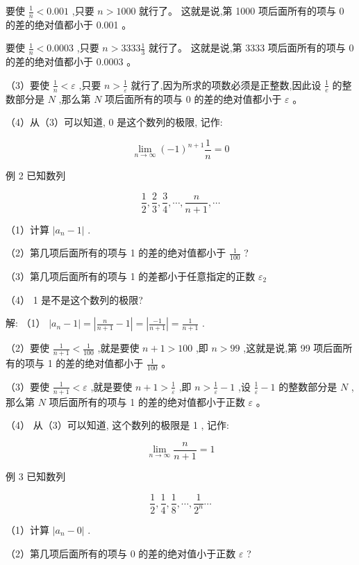 \documentclass[lang=cn,newtx,12pt,scheme=chinese]{elegantbook}
\begin{document}
要使 \(\frac{1}{n} < {0.001}\) ,只要 \(n > {1000}\) 就行了。 这就是说,第 1000 项后面所有的项与 0 的差的绝对值都小于 0.001 。

要使 \(\frac{1}{n} < {0.0003}\) ,只要 \(n > {3333}\frac{1}{3}\) 就行了。 这就是说,第 3333 项后面所有的项与 0 的差的绝对值都小于 0.0003 。

（3）要使 \(\frac{1}{n} < \varepsilon\) ,只要 \(n > \frac{1}{\varepsilon }\) 就行了,因为所求的项数必须是正整数,因此设 \(\frac{1}{e}\) 的整数部分是 \(N\) ,那么第 \(N\) 项后面所有的项与 0 的差的绝对值都小于 \(\varepsilon\) 。

（4）从（3）可以知道, 0 是这个数列的极限, 记作:

\[
\mathop{\lim }\limits_{{n \rightarrow \infty }}{\left( -1\right) }^{n + 1}\frac{1}{n} = 0
\]

例 2 已知数列

\[
\frac{1}{2},\frac{2}{3},\frac{3}{4},\cdots ,\frac{n}{n + 1},\cdots
\]

（1）计算 \(\left| {{a}_{n} - 1}\right|\) .

（2）第几项后面所有的项与 1 的差的绝对值都小于 \(\frac{1}{100}\) ?

（3）第几项后面所有的项与 1 的差都小于任意指定的正数 \({\varepsilon }_{2}\)

（4） 1 是不是这个数列的极限?

解: （1） \(\left| {{a}_{n} - 1}\right| = \left| {\frac{n}{n + 1} - 1}\right| = \left| \frac{-1}{n + 1}\right| = \frac{1}{n + 1}\) .

（2）要使 \(\frac{1}{n + 1} < \frac{1}{100}\) ,就是要使 \(n + 1 > {100}\) ,即 \(n > {99}\) ,这就是说,第 99 项后面所有的项与 1 的差的绝对值都小于 \(\frac{1}{100}\) 。

（3）要使 \(\frac{1}{n + 1} < \varepsilon\) ,就是要使 \(n + 1 > \frac{1}{\varepsilon }\) ,即 \(n > \frac{1}{\varepsilon } - 1\) ,设 \(\frac{1}{\varepsilon } - 1\) 的整数部分是 \(N\) ,那么第 \(N\) 项后面所有的项与 1 的差的绝对值都小于正数 \(\varepsilon\) 。

（4） 从（3）可以知道, 这个数列的极限是 1 , 记作:

\[
\mathop{\lim }\limits_{{n \rightarrow \infty }}\frac{n}{n + 1} = 1
\]

例 3 已知数列

\[
\frac{1}{2},\frac{1}{4},\frac{1}{8},\cdots ,\frac{1}{{2}^{n}}\cdots
\]

（1）计算 \(\left| {{a}_{n} - 0}\right|\) .

（2）第几项后面所有的项与 0 的差的绝对值小于正数 \(\varepsilon\) ?
\end{document}
